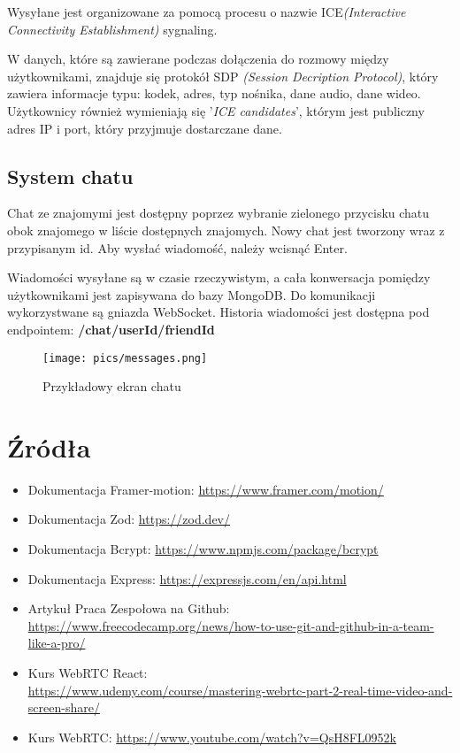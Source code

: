 \documentclass{article}
\begin{document}
Wysyłane jest organizowane za pomocą procesu o nazwie ICE\textit{(Interactive Connectivity Establishment)} sygnaling.

 W danych, które są zawierane podczas dołączenia do rozmowy między użytkownikami, znajduje się protokół SDP \textit{(Session Decription Protocol)}, który zawiera informacje typu: kodek, adres, typ nośnika, dane audio, dane wideo. Użytkownicy również wymieniają się '\textit{ICE candidates}', którym jest publiczny adres IP i port, który przyjmuje dostarczane dane.

\subsection{System chatu}

Chat ze znajomymi jest dostępny poprzez wybranie zielonego przycisku chatu obok znajomego w liście dostępnych znajomych. Nowy chat jest tworzony wraz z przypisanym id. Aby wysłać wiadomość, należy wcisnąć Enter.

Wiadomości wysyłane są w czasie rzeczywistym, a cała konwersacja pomiędzy użytkownikami jest zapisywana do bazy MongoDB. Do komunikacji wykorzystwane są gniazda WebSocket. Historia wiadomości jest dostępna pod endpointem: \textbf{/chat/userId/friendId}

\begin{figure}[h]
    \centering
    \texttt{[image: pics/messages.png]}
    \caption*{Przykładowy ekran chatu}
\end{figure}


\section{Źródła}
\begin{itemize}
    \item Dokumentacja Framer-motion: \url{https://www.framer.com/motion/}
    \item Dokumentacja Zod: \url{https://zod.dev/}
    \item Dokumentacja Bcrypt: \url{https://www.npmjs.com/package/bcrypt}
    \item Dokumentacja Express: \url{https://expressjs.com/en/api.html}
    \item Artykuł Praca Zespołowa na Github: \\
    \url{https://www.freecodecamp.org/news/how-to-use-git-and-github-in-a-team-like-a-pro/}
    \item Kurs WebRTC React: \\
    \url{https://www.udemy.com/course/mastering-webrtc-part-2-real-time-video-and-screen-share/}
    \item Kurs WebRTC: \url{https://www.youtube.com/watch?v=QsH8FL0952k}
\end{itemize}
\end{document}
